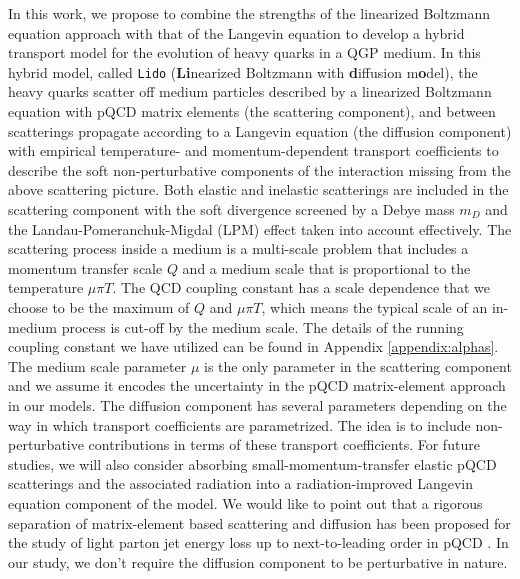 \documentclass[aps, prc, reprint, amsmath, groupedaddress, nofootinbib]{revtex4-1}
\begin{document}
In this work, we propose to combine the strengths of the linearized Boltzmann equation approach with that of the Langevin equation to develop a hybrid transport model for the evolution of heavy quarks in a QGP medium.
In this hybrid model, called {\tt Lido} ({\bf Li}nearized Boltzmann with {\bf d}iffusion m{\bf o}del),  the heavy quarks scatter off medium particles described by a linearized Boltzmann equation with pQCD matrix elements (the scattering component), and between scatterings propagate according to a Langevin equation (the diffusion component) with empirical temperature- and momentum-dependent transport coefficients to describe the soft non-perturbative components of the interaction missing from the above scattering picture.
Both elastic and inelastic scatterings are included in the scattering component with the soft divergence screened by a Debye mass $m_D$ and the Landau-Pomeranchuk-Migdal (LPM) effect taken into account effectively.
The scattering process inside a medium is a multi-scale problem that includes a momentum transfer scale $Q$ and a medium scale that is proportional to the temperature $\mu\pi T$.
The QCD coupling constant has a scale dependence that we choose to be the maximum of $Q$ and $\mu\pi T$, which means the typical scale of an in-medium process is cut-off by the medium scale.
The details of the running coupling constant we have utilized can be found in Appendix \ref{appendix:alphas}.
The medium scale parameter $\mu$ is the only parameter in the scattering component and we assume it encodes the uncertainty in the pQCD matrix-element approach in our models.
The diffusion component has several parameters depending on the way in which transport coefficients are parametrized. 
The idea is to include non-perturbative contributions in terms of these transport coefficients.
For future studies, we will also consider absorbing small-momentum-transfer elastic pQCD scatterings and the associated radiation into a radiation-improved Langevin equation component of the model.
We would like to point out that a rigorous separation of matrix-element based scattering and diffusion has been proposed for the study of light parton jet energy loss up to next-to-leading order in pQCD \cite{Ghiglieri:2015ala}.
In our study, we don't require the diffusion component to be perturbative in nature.
\end{document}
